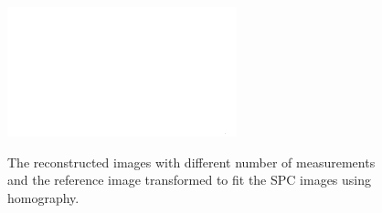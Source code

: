 \begin{figure}[H]
\begin{minipage}[t]{0.22\textwidth}
    \label{fig:hom_15}
    \includegraphics[width = \textwidth]{result/hom/im_m30.png}
    \label{fig:hom_30}
\end{minipage}

    \caption{The reconstructed images with different number of measurements and the reference image transformed to fit the SPC images using homography.}
    \label{fig:hom_over_im}
\end{figure}


